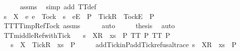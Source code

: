 \begin{isabellebody}
\ \ \ \ \isamarkupfalse%
\ assms\ \isamarkupfalse%
\ {\isacharparenleft}simp\ add{\isacharcolon}\ TT{}{\isacharunderscore}def{\isacharparenright}\ \isanewline
\ \ \isamarkupfalse%
\ \isamarkupfalse%
\ {\isachardoublequoteopen}s\ {\isacharat}\ {\isacharbrackleft}{\isacharbrackleft}X\ {\isasymunion}\ {\isacharbraceleft}e{\isachardot}\ e\ {\isasymnoteq}\ Tock\ {\isasymand}\ s\ {\isacharat}\ {\isacharbrackleft}{\isacharbrackleft}e{\isacharbrackright}\isactrlsub E{\isacharbrackright}\ {\isasymnotin}\ P{\isacharbraceright}\ {\isasymunion}\ {\isacharbraceleft}Tick{\isacharbraceright}{\isacharbrackright}\isactrlsub R{\isacharbrackright}\ {\isacharat}\ {\isacharbrackleft}{\isacharbrackleft}Tock{\isacharbrackright}\isactrlsub E{\isacharbrackright}\ {\isasymin}\ P{\isachardoublequoteclose}\isanewline
\ \ \ \ \isamarkupfalse%
\ TT{}{\isacharunderscore}TT{}{\isacharunderscore}imp{\isacharunderscore}Ref{\isacharunderscore}Tock\ assms\isanewline
\ \ \ \ \isamarkupfalse%
\ auto\isanewline
\ \ \isamarkupfalse%
\ \isamarkupfalse%
\ {\isacharquery}thesis\ \isamarkupfalse%
\ auto\isanewline
{}\isamarkupfalse%
%
\endisatagproof
{\isafoldproof}%
%
\isadelimproof
\isanewline
%
\endisadelimproof
\isanewline
{}\isamarkupfalse%
\ TT{}{\isacharunderscore}middle{\isacharunderscore}Ref{\isacharunderscore}with{\isacharunderscore}Tick{\isacharcolon}\isanewline
\ \ \ {\isachardoublequoteopen}s\ {\isacharat}\ {\isacharbrackleft}{\isacharbrackleft}X{\isacharbrackright}\isactrlsub R{\isacharbrackright}\ {\isacharat}\ xs\ {\isasymin}\ P{\isachardoublequoteclose}\ {\isachardoublequoteopen}TT{}\ P{\isachardoublequoteclose}\ {\isachardoublequoteopen}TT{}\ P{\isachardoublequoteclose}\isanewline
\ \ \ {\isachardoublequoteopen}s\ {\isacharat}\ {\isacharbrackleft}{\isacharbrackleft}X\ {\isasymunion}\ {\isacharbraceleft}Tick{\isacharbraceright}{\isacharbrackright}\isactrlsub R{\isacharbrackright}\ {\isacharat}\ xs\ {\isasymin}\ P{\isachardoublequoteclose}\isanewline
%
\isadelimproof
%
\endisadelimproof
%
\isatagproof
{}\isamarkupfalse%
\ {\isacharminus}\isanewline
\ \ \isamarkupfalse%
\ add{\isacharunderscore}Tick{\isacharunderscore}in{\isacharunderscore}P{\isacharcolon}{\isachardoublequoteopen}add{\isacharunderscore}Tick{\isacharunderscore}refusal{\isacharunderscore}trace\ {\isacharparenleft}s\ {\isacharat}\ {\isacharbrackleft}{\isacharbrackleft}X{\isacharbrackright}\isactrlsub R{\isacharbrackright}\ {\isacharat}\ xs{\isacharparenright}\ {\isasymin}\ P{\isachardoublequoteclose}\isanewline

\end{isabellebody}
